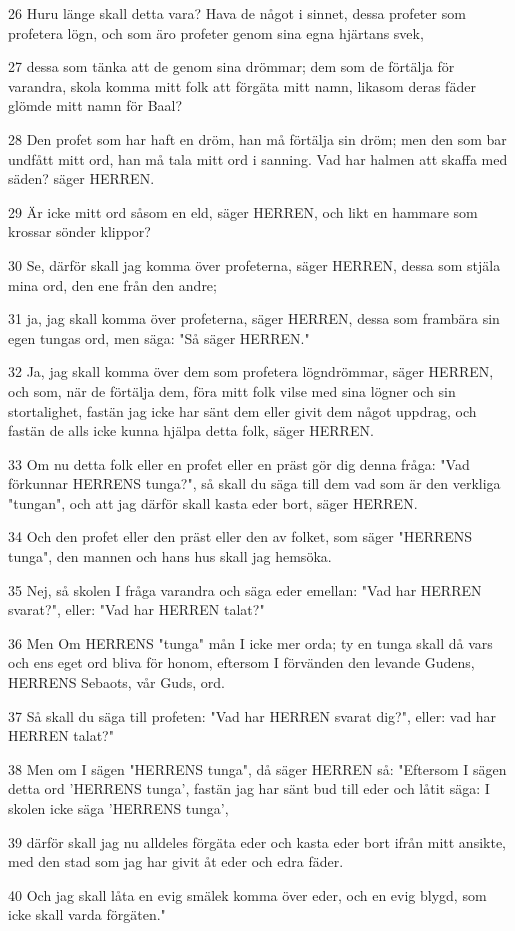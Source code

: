 \par 26 Huru länge skall detta vara? Hava de något i sinnet, dessa profeter som profetera lögn, och som äro profeter genom sina egna hjärtans svek,
\par 27 dessa som tänka att de genom sina drömmar; dem som de förtälja för varandra, skola komma mitt folk att förgäta mitt namn, likasom deras fäder glömde mitt namn för Baal?
\par 28 Den profet som har haft en dröm, han må förtälja sin dröm; men den som bar undfått mitt ord, han må tala mitt ord i sanning. Vad har halmen att skaffa med säden? säger HERREN.
\par 29 Är icke mitt ord såsom en eld, säger HERREN, och likt en hammare som krossar sönder klippor?
\par 30 Se, därför skall jag komma över profeterna, säger HERREN, dessa som stjäla mina ord, den ene från den andre;
\par 31 ja, jag skall komma över profeterna, säger HERREN, dessa som frambära sin egen tungas ord, men säga: "Så säger HERREN."
\par 32 Ja, jag skall komma över dem som profetera lögndrömmar, säger HERREN, och som, när de förtälja dem, föra mitt folk vilse med sina lögner och sin stortalighet, fastän jag icke har sänt dem eller givit dem något uppdrag, och fastän de alls icke kunna hjälpa detta folk, säger HERREN.
\par 33 Om nu detta folk eller en profet eller en präst gör dig denna fråga: "Vad förkunnar HERRENS tunga?", så skall du säga till dem vad som är den verkliga "tungan", och att jag därför skall kasta eder bort, säger HERREN.
\par 34 Och den profet eller den präst eller den av folket, som säger "HERRENS tunga", den mannen och hans hus skall jag hemsöka.
\par 35 Nej, så skolen I fråga varandra och säga eder emellan: "Vad har HERREN svarat?", eller: "Vad har HERREN talat?"
\par 36 Men Om HERRENS "tunga" mån I icke mer orda; ty en tunga skall då vars och ens eget ord bliva för honom, eftersom I förvänden den levande Gudens, HERRENS Sebaots, vår Guds, ord.
\par 37 Så skall du säga till profeten: "Vad har HERREN svarat dig?", eller: vad har HERREN talat?"
\par 38 Men om I sägen "HERRENS tunga", då säger HERREN så: "Eftersom I sägen detta ord 'HERRENS tunga', fastän jag har sänt bud till eder och låtit säga: I skolen icke säga 'HERRENS tunga',
\par 39 därför skall jag nu alldeles förgäta eder och kasta eder bort ifrån mitt ansikte, med den stad som jag har givit åt eder och edra fäder.
\par 40 Och jag skall låta en evig smälek komma över eder, och en evig blygd, som icke skall varda förgäten."

